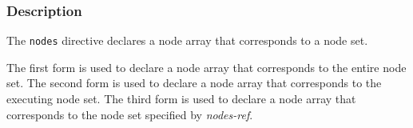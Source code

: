 

\subsubsection*{Description}

The {\tt nodes} directive declares a node array that corresponds to a
node set.

The first form is used to declare a node array that corresponds to the
entire node set.
The second form is used to declare a node array that corresponds to the
executing node set.
The third form is used to declare a node array that corresponds to the
node set specified by {\it nodes-ref}.

%

